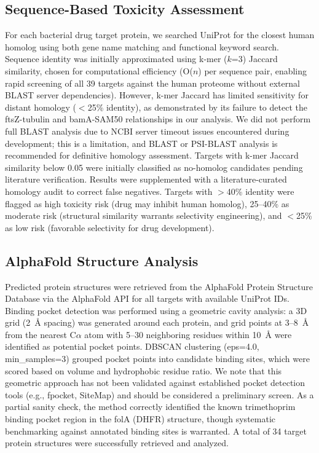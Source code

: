 \documentclass[12pt,a4paper]{article}
\begin{document}
\subsection{Sequence-Based Toxicity Assessment}
For each bacterial drug target protein, we searched UniProt for the closest human homolog using both gene name matching and functional keyword search. Sequence identity was initially approximated using k-mer ($k$=3) Jaccard similarity, chosen for computational efficiency (O($n$) per sequence pair, enabling rapid screening of all 39 targets against the human proteome without external BLAST server dependencies). However, k-mer Jaccard has limited sensitivity for distant homology ($<$25\% identity), as demonstrated by its failure to detect the ftsZ-tubulin and bamA-SAM50 relationships in our analysis. We did not perform full BLAST analysis due to NCBI server timeout issues encountered during development; this is a limitation, and BLAST or PSI-BLAST analysis is recommended for definitive homology assessment. Targets with k-mer Jaccard similarity below 0.05 were initially classified as no-homolog candidates pending literature verification. Results were supplemented with a literature-curated homology audit to correct false negatives. Targets with $>$40\% identity were flagged as high toxicity risk (drug may inhibit human homolog), 25--40\% as moderate risk (structural similarity warrants selectivity engineering), and $<$25\% as low risk (favorable selectivity for drug development).

\subsection{AlphaFold Structure Analysis}
Predicted protein structures were retrieved from the AlphaFold Protein Structure Database \citep{jumper2021} via the AlphaFold API for all targets with available UniProt IDs. Binding pocket detection was performed using a geometric cavity analysis: a 3D grid (2~\AA{} spacing) was generated around each protein, and grid points at 3--8~\AA{} from the nearest C$\alpha$ atom with 5--30 neighboring residues within 10~\AA{} were identified as potential pocket points. DBSCAN clustering (eps=4.0, min\_samples=3) grouped pocket points into candidate binding sites, which were scored based on volume and hydrophobic residue ratio. We note that this geometric approach has not been validated against established pocket detection tools (e.g., fpocket, SiteMap) and should be considered a preliminary screen. As a partial sanity check, the method correctly identified the known trimethoprim binding pocket region in the folA (DHFR) structure, though systematic benchmarking against annotated binding sites is warranted. A total of 34 target protein structures were successfully retrieved and analyzed.
\end{document}
